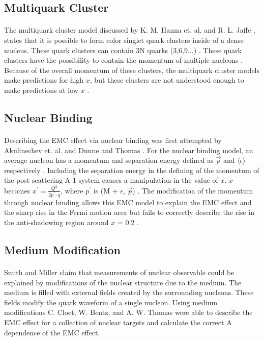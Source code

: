 \subsection{Multiquark Cluster}
\paragraph{} The multiquark cluster model discussed by K. M. Hanna et. al. \cite{EMC_multiQ} and R. L. Jaffe \cite{EMC_multiQ_2}, states that it is possible to form color singlet quark clusters inside of a dense nucleus. These quark clusters can contain 3N quarks (3,6,9...) \cite{Norton}. These quark clusters have the possibility to contain the momentum of multiple nucleons \cite{Ajth}. Because of the overall momentum of these clusters, the multiquark cluster models make predictions for high $x $, but these clusters are not understood enough to make predictions at low $x$ \cite{ EMC_model_1,Geesaman,  Ajth,EMC_multiQ}.  

\subsection{Nuclear Binding}
\paragraph{} Describing the EMC effect via nuclear binding was first attempted by Akulinechev et. al. \cite{EMC_binding_3} and Dunne and Thomas \cite{EMC_binding_2}. For the nuclear binding model, an average nucleon has a momentum and separation energy defined as $\vec{p}$ and $\langle \epsilon \rangle$ respectively \cite{Norton}. Including the separation energy in the defining of the momentum of the post scattering A-1 system causes a manipulation in the value of $x$. $x$ becomes $x^{\prime} = \frac{Q^2}{2p^{\prime}\cdot q}$, where $p^{\prime}$ is (M + $\epsilon$, $\vec{p}$) \cite{Norton}. The modification of the momentum through nuclear binding allows this EMC model to explain the EMC effect and the sharp rise in the Fermi motion area but fails to correctly describe the rise in the anti-shadowing region around $x$ = 0.2 \cite{EMC_binding, EMC_model_1, Ajth}.

\subsection{Medium Modification}
\paragraph{} Smith and Miller \cite{EMC_medium_2} claim that measurements of nuclear observable could be explained by modifications of the nuclear structure due to the medium. The medium is filled with external fields created by the surrounding nucleons. These fields modify the quark waveform of a single nucleon. Using medium modifications C. Cloet, W. Bentz, and A. W. Thomas \cite{EMC_medium_1} were able to describe the EMC effect for a collection of nuclear targets and calculate the correct A dependence of the EMC effect. 


